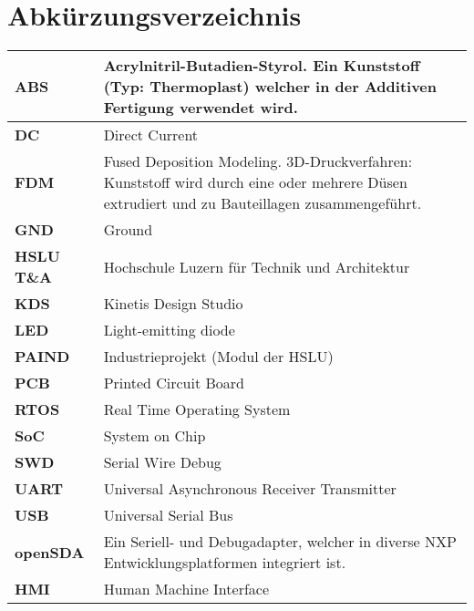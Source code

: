 \newpage
\section*{Abkürzungsverzeichnis}\label{dok:glossar}
\begin{table}[H]
	\begin{tabular}{|L{2.5cm}|L{13cm}|}

		\hline	
		\textbf{ABS} & Acrylnitril-Butadien-Styrol. Ein Kunststoff (Typ: Thermoplast) welcher in der Additiven Fertigung verwendet wird.\\
		
		\hline	
		\textbf{DC} & Direct Current\\

		\hline
		\textbf{FDM} & Fused Deposition Modeling. 3D-Druckverfahren: Kunststoff wird durch eine oder mehrere Düsen extrudiert und zu Bauteillagen zusammengeführt.\\
		
		\hline
		\textbf{GND} & Ground\\
		
		\hline
		\textbf{HSLU T\&A} & Hochschule Luzern für Technik und Architektur\\ 
		
		\hline
		\textbf{KDS} & Kinetis Design Studio\\

		\hline
		\textbf{LED} & Light-emitting diode\\
		
	 	\hline
	 	\textbf{PAIND} &  Industrieprojekt (Modul der HSLU) \\ 
	 	
	 	\hline
	 	\textbf{PCB} &	Printed Circuit Board\\
				
		\hline
		\textbf{RTOS} & Real Time Operating System \\
		
		\hline
		\textbf{SoC} &	System on Chip\\
		
		\hline
		\textbf{SWD} &	Serial Wire Debug\\
		
		\hline
		\textbf{UART} &	Universal Asynchronous Receiver Transmitter\\
		
		\hline
		\textbf{USB} &	Universal Serial Bus\\		
		
		\hline
		\textbf{openSDA} & Ein Seriell- und Debugadapter, welcher in diverse NXP Entwicklungsplatformen integriert ist.\\
		
		\hline
		\textbf{HMI} & Human Machine Interface\\
				
		\hline
	\end{tabular} 
	\vspace{0.2cm}
\end{table}


